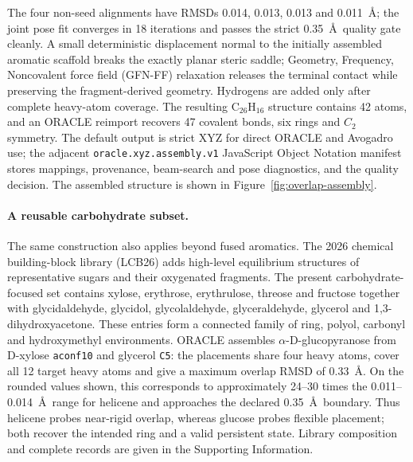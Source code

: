 \documentclass[journal=jctcce,manuscript=article]{achemso}
\begin{document}
The four non-seed alignments have RMSDs 0.014, 0.013, 0.013 and
0.011~\AA; the joint pose fit converges in 18 iterations and passes the
strict 0.35~\AA\ quality gate cleanly.  A small deterministic
displacement normal to the initially assembled aromatic scaffold breaks the
exactly planar steric saddle; Geometry, Frequency, Noncovalent force field (GFN-FF) relaxation releases the terminal
contact while preserving the fragment-derived geometry.  Hydrogens are
added only after complete heavy-atom coverage.  The resulting
C$_{26}$H$_{16}$ structure contains 42 atoms, and an ORACLE reimport recovers
47 covalent bonds, six rings and $C_2$ symmetry.  The default output is strict
XYZ for direct ORACLE and Avogadro use; the adjacent
\texttt{oracle.xyz.assembly.v1} JavaScript Object Notation manifest stores
mappings, provenance,
beam-search and pose diagnostics, and the quality decision.
The assembled structure is shown in Figure~\ref{fig:overlap-assembly}.

\paragraph{A reusable carbohydrate subset.}
The same construction also applies beyond fused aromatics.  The 2026 chemical
building-block library (LCB26) adds high-level equilibrium
structures of representative sugars and their oxygenated fragments.
The present carbohydrate-focused set contains xylose, erythrose, erythrulose,
threose and fructose together with glycidaldehyde, glycidol, glycolaldehyde,
glyceraldehyde, glycerol and 1,3-dihydroxyacetone.  These entries form a
connected family of ring, polyol, carbonyl and hydroxymethyl environments.
ORACLE assembles $\alpha$-D-glucopyranose from D-xylose
\texttt{aconf10} and glycerol \texttt{C5}: the placements share four heavy
atoms, cover all 12 target heavy atoms and give a maximum overlap RMSD of
0.33~\AA.  On the rounded values shown, this corresponds to approximately
24--30 times the 0.011--0.014~\AA\ range for
helicene and approaches the declared 0.35~\AA\ boundary.  Thus helicene probes
near-rigid overlap, whereas glucose probes flexible placement; both recover
the intended ring and a valid persistent state.  Library composition and
complete records are given in the Supporting Information.
\end{document}
